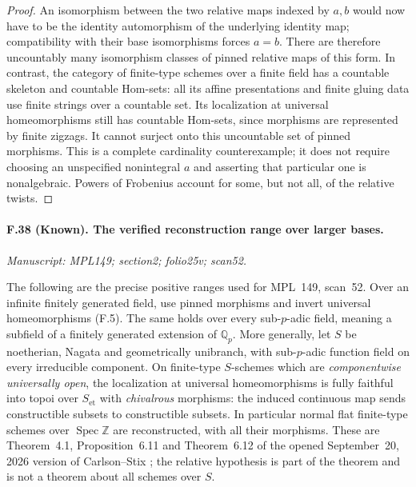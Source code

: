 \begin{proof}
An isomorphism between the two relative maps indexed by $a,b$ would now
have to be the identity automorphism of the underlying identity map;
compatibility with their base isomorphisms forces $a=b$. There are
therefore uncountably many isomorphism classes of pinned relative maps
of this form. In contrast, the category of finite-type schemes over a
finite field has a countable skeleton and countable Hom-sets: all its
affine presentations and finite gluing data use finite strings over a
countable set. Its localization at universal homeomorphisms still has
countable Hom-sets, since morphisms are represented by finite zigzags.
It cannot surject onto this uncountable set of pinned morphisms.
This is a complete cardinality counterexample; it does not require
choosing an unspecified nonintegral $a$ and asserting that particular
one is nonalgebraic. Powers of Frobenius account for some, but not all,
of the relative twists.
\end{proof}

\paragraph{F.38 (Known). The verified reconstruction range over larger bases.}
\textit{Manuscript: MPL149; section2; folio25v; scan52.}

The following are the precise positive ranges used for MPL~149,
scan~52. Over an infinite finitely generated field, use pinned morphisms
and invert universal homeomorphisms (F.5). The same holds over every
sub-$p$-adic field, meaning a subfield of a finitely generated extension
of $\mathbb Q_p$. More generally, let $S$ be noetherian, Nagata and
geometrically unibranch, with sub-$p$-adic function field on every
irreducible component. On finite-type $S$-schemes which are
\emph{componentwise universally open}, the localization at universal
homeomorphisms is fully faithful into topoi over $S_{\mathrm{et}}$ with
\emph{chivalrous} morphisms: the induced continuous map sends
constructible subsets to constructible subsets. In particular normal
flat finite-type schemes over $\operatorname{Spec}\mathbb Z$ are
reconstructed, with all their morphisms. These are Theorem~4.1,
Proposition~6.11 and Theorem~6.12 of the opened September~20, 2026 version
of Carlson--Stix \cite{CarlsonStix2026}; the relative hypothesis is part
of the theorem and is not a theorem about all schemes over $S$.

